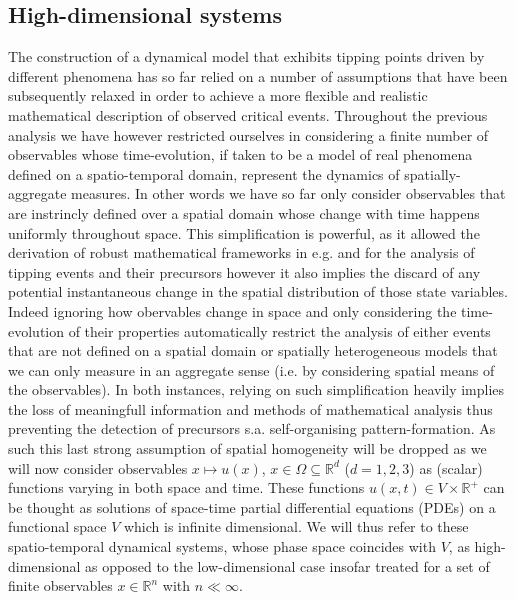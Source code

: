 \documentclass[../main.tex]{subfiles}
\begin{document}
\subsection{High-dimensional systems}\label{subsec3.2}
The construction of a dynamical model that exhibits tipping points driven by different phenomena has so far relied on a number of assumptions that have been subsequently relaxed in order to achieve a more flexible and realistic mathematical description of observed critical events. 
Throughout the previous analysis we have however restricted ourselves in considering a finite number of observables whose time-evolution, if taken to be a model of real phenomena defined on a spatio-temporal domain, represent the dynamics of spatially-aggregate measures.
In other words we have so far only consider observables that are instrincly defined over a spatial domain whose change with time happens uniformly throughout space. This simplification is powerful, as it allowed the derivation of robust mathematical frameworks in e.g. \cite{Kuehn11} and \cite{Ashwin12} for the analysis of tipping events and their precursors however it also implies the discard of any potential instantaneous change in the spatial distribution of those state variables.
Indeed ignoring how obervables change in space and only considering the time-evolution of their properties automatically restrict the analysis of either events that are not defined on a spatial domain or spatially heterogeneous models that we can only measure in an aggregate sense (i.e. by considering spatial means of the observables).
In both instances, relying on such simplification heavily implies the loss of meaningfull information and methods of mathematical analysis thus preventing the detection of precursors s.a. self-organising pattern-formation.
As such this last strong assumption of spatial homogeneity will be dropped as we will now consider observables $x\mapsto u(x)$, $x\in \Omega\subseteq\mathbb{R}^{d}$ ($d=1,2,3$) as (scalar) functions varying in both space and time.
These functions $u(x,t)\in V\times \mathbb{R}^{+}$ can be thought as solutions of space-time partial differential equations (PDEs) on a functional space $V$ which is infinite dimensional.
We will thus refer to these spatio-temporal dynamical systems, whose phase space coincides with $V$, as high-dimensional as opposed to the low-dimensional case insofar treated for a set of finite observables $x\in \mathbb{R}^{n}$ with $n\ll\infty$.


\end{document}
